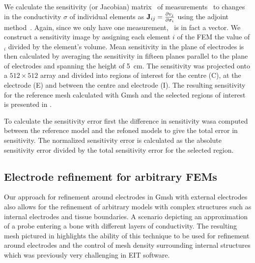
We calculate the sensitivity (or Jacobian) matrix \JB\ of measurements \vB\ to
changes in the conductivity $\sigma$ of individual elements as
${\mbox{\bf J}}_{ij}=\frac{\partial v_j}{\partial \sigma_i}$ using the adjoint
method~\parencite{polydorides_electrode_2002}. Again, since we only have one measurement, \JB\
is in fact a vector.
We construct a sensitivity image by assigning each element
$i$ of the FEM the value of \JB$_i$ divided by the element's volume.
Mean sensitivity in the plane of electrodes is then calculated by averaging
the sensitivity in fifteen planes parallel to the plane of electrodes and
spanning the height of 5~cm. 
The sensitivity was projected onto a $512\times512$ array and divided into regions
of interest for the centre (C), at the electrode (E) and between the centre and electrode
(I). The resulting sensitivity for the reference mesh calculated with Gmsh and the 
selected regions of interest is presented in \fref{fig:roiMethods}.

To calculate the sensitivity error first the difference in sensitivity wasa computed between the 
reference model and the refoned models to give the total error in sensitivity.
The normalized sensitivity error is calculated as the absolute sensitivity error 
divided by the total sensitivity error
for the selected region.


\subsection{Electrode refinement for arbitrary FEMs}
Our approach for refinement around electrodes in Gmsh with external electrodes 
also allows for the refinement of arbitrary models with complex structures
such as internal electrodes and tissue boundaries.
A scenario depicting an approximation of 
a probe entering a bone with different 
layers of conductivity. The resulting mesh pictured in 
highlights the ability of this technique
to be used for refinement around electrodes and the control of mesh density  
surrounding internal structures which was previously
very challenging in EIT software.

